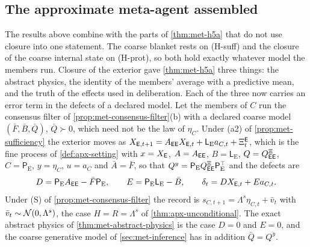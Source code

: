 \subsection{The approximate meta-agent assembled}\label{sec:apx-h5a}

The results above combine with the parts of \cref{thm:met-h5a} that do not use closure into one statement. The coarse blanket rests on (H-suff) and the closure of the coarse internal state on (H-prot), so both hold exactly whatever model the members run. Closure of the exterior gave \cref{thm:met-h5a} three things: the abstract physics, the identity of the members' average with a predictive mean, and the truth of the effects used in deliberation. Each of the three now carries an error term in the defects of a declared model. Let the members of $C$ run the consensus filter of \cref{prop:met-consensus-filter}(b) with a declared coarse model $(\bar F,\bar B,\bar Q)$, $\bar Q\succ0$, which need not be the law of $\eta_C$. Under (a2) of \cref{prop:met-sufficiency} the exterior moves as $X_{\mathsf{E},t+1}=A_{\mathsf{E}\mathsf{E}}X_{\mathsf{E},t}+\mathsf L_{\mathrm E}a_{C,t}+\Xi^{\mathsf{E}}_t$, which is the fine process of \cref{def:apx-setting} with $x=X_{\mathsf{E}}$, $A=A_{\mathsf{E}\mathsf{E}}$, $B=\mathsf L_{\mathrm E}$, $Q=Q^{\Xi}_{\mathsf{E}\mathsf{E}}$, $C=\mathsf P_{\mathrm E}$, $y=\eta_C$, $u=a_C$ and $\bar A=\bar F$, so that $Q^y=\mathsf P_{\mathrm E}Q^{\Xi}_{\mathsf{E}\mathsf{E}}\mathsf P_{\mathrm E}^\top$ and the defects are
\begin{equation}\label{eq:apx-h5a-defects}
D=\mathsf P_{\mathrm E}A_{\mathsf{E}\mathsf{E}}-\bar F\mathsf P_{\mathrm E},\qquad E=\mathsf P_{\mathrm E}\mathsf L_{\mathrm E}-\bar B,\qquad\delta_t=DX_{\mathsf{E},t}+Ea_{C,t} .
\end{equation}
Under (S) of \cref{prop:met-consensus-filter} the record is $s_{C,t+1}=\Lambda^s\eta_{C,t}+\bar v_t$ with $\bar v_t\sim\mathcal{N}(0,\Lambda^s)$, the case $H=R=\Lambda^s$ of \cref{thm:apx-unconditional}. The exact abstract physics of \cref{thm:met-abstract-physics} is the case $D=0$ and $E=0$, and the coarse generative model of \cref{sec:met-inference} has in addition $\bar Q=Q^y$.

